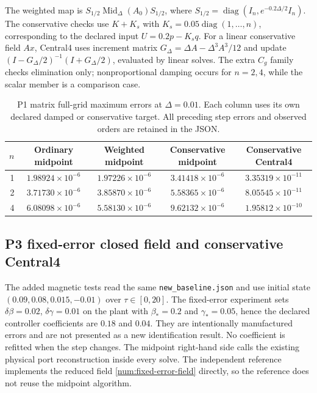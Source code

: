 The weighted map is
$S_{1/2}\operatorname{Mid}_\Delta(A_0)S_{1/2}$, where
$S_{1/2}=\operatorname{diag}(I_n,e^{-0.2\Delta/2}I_n)$.
The conservative checks use $K+K_s$ with
$K_s=0.05\operatorname{diag}(1,\ldots,n)$, corresponding to the declared
input $U=0.2p-K_sq$. For a linear conservative field $Ax$, Central4 uses
increment matrix $G_\Delta=\Delta A-\Delta^3A^3/12$ and update
$(I-G_\Delta/2)^{-1}(I+G_\Delta/2)$, evaluated by linear solves.
The extra $C_g$ family checks elimination only; nonproportional damping
occurs for $n=2,4$, while the scalar member is a comparison case.

\begin{table}[t]
\centering
\caption{P1 matrix full-grid maximum errors at $\Delta=0.01$. Each column uses its own declared damped or conservative target. All preceding step errors and observed orders are retained in the JSON.}
\label{sx:framework-matrix-errors}
\begin{tabular}{rcccc}
\toprule
$n$ & Ordinary midpoint & Weighted midpoint & Conservative midpoint & Conservative Central4\\
\midrule
1 & $1.98924\times10^{-6}$ & $1.97226\times10^{-6}$ & $3.41418\times10^{-6}$ & $3.35319\times10^{-11}$ \\
2 & $3.71730\times10^{-6}$ & $3.85870\times10^{-6}$ & $5.58365\times10^{-6}$ & $8.05545\times10^{-11}$ \\
4 & $6.08098\times10^{-6}$ & $5.58130\times10^{-6}$ & $9.62132\times10^{-6}$ & $1.95812\times10^{-10}$ \\
\bottomrule
\end{tabular}
\end{table}

\subsection{P3 fixed-error closed field and conservative Central4}
\label{sx:framework-closed}
The added magnetic tests read the same \texttt{new\_baseline.json} and
use initial state $(0.09,0.08,0.015,-0.01)$ over $\tau\in[0,20]$.
The fixed-error experiment sets $\delta\beta=0.02$,
$\delta\gamma=0.01$ on the plant with $\beta_*=0.2$ and
$\gamma_*=0.05$, hence the declared controller coefficients are
$0.18$ and $0.04$. They are intentionally manufactured errors and are
not presented as a new identification result. No coefficient is refitted
when the step changes. The midpoint right-hand side calls the existing
physical port reconstruction inside every solve. The independent
reference implements the reduced field \eqref{num:fixed-error-field}
directly, so the reference does not reuse the midpoint algorithm.

